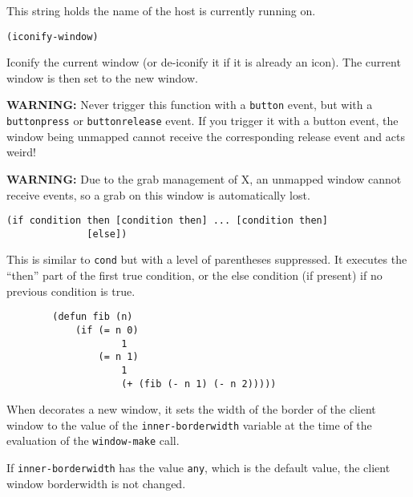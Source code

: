 This string holds the name of the host {\GWM} is currently running on.

        
{\usagefont\begin{verbatim}
(iconify-window)
\end{verbatim}}\usageupspace

Iconify the current window (or de-iconify it if it is already an icon). The
current window is then set to the new window. 

{\bf WARNING:} Never trigger this function with a \verb"button" event, but
with a \verb"buttonpress" or \verb"buttonrelease" event. If you trigger it
with a button event, the window being unmapped cannot receive the
corresponding release event and {\GWM} acts weird!

{\bf WARNING:} Due to the grab management of X, an unmapped window cannot
receive events, so a grab on this window is automatically lost.

        
{\usagefont\begin{verbatim}
(if condition then [condition then] ... [condition then]
              [else])
\end{verbatim}}\usageupspace

This is similar to \verb"cond" but with a level of parentheses suppressed.  It
executes the ``then'' part of the first true condition, or the else condition
(if present) if no previous condition is true.

{\exemplefont\begin{verbatim}
        (defun fib (n)
            (if (= n 0)
                    1
                (= n 1) 
                    1
                    (+ (fib (- n 1) (- n 2)))))
\end{verbatim}}

        

When {\GWM} decorates a new window, it sets the width of the border of the
client window to the value of the \verb"inner-borderwidth" variable at the
time of the evaluation of the \verb"window-make" call.

If \verb"inner-borderwidth" has the value \verb"any", which is the default
value, the client window borderwidth is not changed.

        
